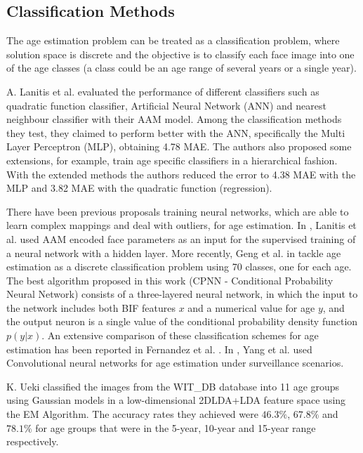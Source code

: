 \subsection{Classification Methods}

The age estimation problem can be treated as a classification problem, where solution space is discrete and the objective is to classify each face image into one of the age classes (a class could be an age range of several years or a single year).

A. Lanitis et al. \cite{Lanitis:2004:CDC:2225304.2226166} evaluated the performance of different classifiers such as quadratic function classifier, Artificial Neural Network (ANN) and nearest neighbour classifier with their AAM model. Among the classification methods they test, they claimed to perform better with the ANN, specifically the Multi Layer Perceptron (MLP), obtaining 4.78 MAE. The authors also proposed some extensions, for example, train age specific classifiers in a hierarchical fashion. With the extended methods the authors reduced the error to 4.38 MAE with the MLP and 3.82 MAE with the quadratic function (regression).

There have been previous proposals training neural networks,
which are able to learn complex mappings and deal with
outliers, for age estimation. In \cite{Lanitis:2004:CDC:2225304.2226166}, Lanitis et al. used AAM encoded face parameters as an input for the supervised training
of a neural network with a hidden layer. More recently, Geng
et al. in \cite{6475129} tackle age estimation as a discrete classification problem using 70 classes, one for each age. The best algorithm proposed in this work (CPNN - Conditional Probability Neural Network) consists of a three-layered neural network, in which the input to the network includes both BIF features $x$ and a numerical value for age $y$, and the output neuron is a single value of the conditional probability density function $p(y|x)$. An extensive comparison of these classification schemes for age estimation has been reported in Fernandez et al. \cite{2014icprw}. In \cite{5995481}, Yang et al. used Convolutional neural networks for age estimation under surveillance scenarios.

K. Ueki \cite{Ueki:2006:SAC:1126250.1126269} classified the images from the WIT\_DB database into 11 age groups using Gaussian models in a low-dimensional 2DLDA+LDA feature space using the EM Algorithm. The accuracy rates they achieved were $46.3\%$, $67.8\%$ and $78.1\%$ for age groups that were in the 5-year, 10-year and 15-year range respectively.

